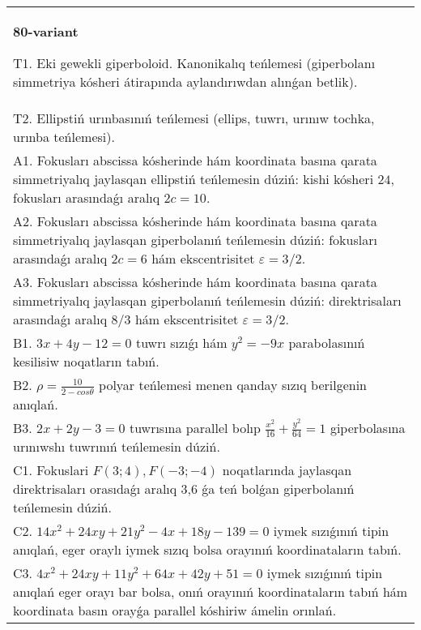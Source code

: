 \documentclass{article}
\begin{document}
\begin{tabular}{m{17cm}}
\textbf{80-variant}
\newline

T1. Eki gewekli giperboloid. Kanonikalıq teńlemesi (giperbolanı simmetriya kósheri átirapında aylandırıwdan alınǵan betlik).\\

T2. Ellipstiń urınbasınıń teńlemesi (ellips, tuwrı, urınıw tochka, urınba teńlemesi).\\

A1. Fokusları abscissa kósherinde hám koordinata basına qarata simmetriyalıq jaylasqan ellipstiń teńlemesin dúziń: kishi kósheri $24$, fokusları arasındaǵı aralıq $2 c=10$.\\

A2. Fokusları abscissa kósherinde hám koordinata basına qarata simmetriyalıq jaylasqan giperbolanıń teńlemesin dúziń: fokusları arasındaǵı aralıq $2 c=6$ hám ekscentrisitet $\varepsilon=3/2$.\\

A3. Fokusları abscissa kósherinde hám koordinata basına qarata simmetriyalıq jaylasqan giperbolanıń teńlemesin dúziń: direktrisaları arasındaǵı aralıq $8/3$ hám ekscentrisitet $\varepsilon=3/2$.\\

B1. $3x + 4y - 12 = 0$ tuwrı sızıǵı hám $y^{2} = - 9x$ parabolasınıń kesilisiw noqatların tabıń.  \\

B2. $\rho = \frac{10}{2 - cos\theta}$ polyar teńlemesi menen qanday sızıq berilgenin anıqlań.  \\

B3. $2x + 2y - 3 = 0$ tuwrısına parallel bolıp $\frac{x^{2}}{16} + \frac{y^{2}}{64} = 1$ giperbolasına urınıwshı tuwrınıń teńlemesin dúziń.  \\

C1. Fokuslari $F(3;4), F(-3;-4)$ noqatlarında jaylasqan direktrisaları orasıdaǵı aralıq 3,6 ǵa teń bolǵan giperbolanıń teńlemesin dúziń.  \\

C2. $14x^{2} + 24xy + 21y^{2} - 4x + 18y - 139 = 0$ iymek sızıǵınıń tipin anıqlań, eger oraylı iymek sızıq bolsa orayınıń koordinataların tabıń.  \\

C3. $4x^{2} + 24xy + 11y^{2} + 64x + 42y + 51 = 0$ iymek sızıǵınıń tipin anıqlań eger orayı bar bolsa, onıń orayınıń koordinataların tabıń hám koordinata basın orayǵa parallel kóshiriw ámelin orınlań.  \\

\end{tabular}
\vspace{1cm}
\end{document}
